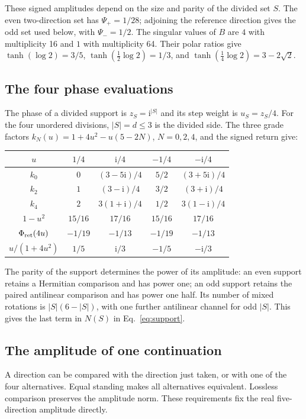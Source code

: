 \documentclass[aps,prx,onecolumn,10pt,notitlepage,nofootinbib,longbibliography]{revtex4-2}
\numberwithin{equation}{section}
\numberwithin{table}{section}
\newcommand{\ii}{\mathrm i}
\newcommand{\Phis}{\Phi_{\rm ret}}
\begin{document}
These signed amplitudes depend on the size and parity of the divided set $S$. The even two-direction set has $\Psi_+=1/28$; adjoining the reference direction gives the odd set used below, with $\Psi_-=1/2$. The singular values of $B$ are $4$ with multiplicity 16 and $1$ with multiplicity 64. Their polar ratios give $\tanh(\log2)=3/5$, $\tanh(\tfrac12\log2)=1/3$, and $\tanh(\tfrac14\log2)=3-2\sqrt2$.

\subsection{The four phase evaluations}
The phase of a divided support is $z_S=\ii^{|S|}$ and its step weight is $u_S=z_S/4$. For the four unordered divisions, $|S|=d\leq3$ is the divided side. The three grade factors $k_N(u)=1+4u^2-u(5-2N)$, $N=0,2,4$, and the signed return give:
\begin{center}\small
\setlength{\tabcolsep}{5pt}
\begin{tabular}{c|cccc}
\toprule
$u$&$1/4$&$\ii/4$&$-1/4$&$-\ii/4$\\\midrule
$k_0$&$0$&$(3-5\ii)/4$&$5/2$&$(3+5\ii)/4$\\
$k_2$&$1$&$(3-\ii)/4$&$3/2$&$(3+\ii)/4$\\
$k_4$&$2$&$3(1+\ii)/4$&$1/2$&$3(1-\ii)/4$\\
$1-u^2$&$15/16$&$17/16$&$15/16$&$17/16$\\
$\Phis(4u)$&$-1/19$&$-1/13$&$-1/19$&$-1/13$\\
$u/(1+4u^2)$&$1/5$&$\ii/3$&$-1/5$&$-\ii/3$\\\bottomrule
\end{tabular}
\end{center}
The parity of the support determines the power of its amplitude: an even
support retains a Hermitian comparison and has power one; an odd support
retains the paired antilinear comparison and has power one half. Its number
of mixed rotations is $|S|(6-|S|)$, with one further antilinear channel for
odd $|S|$. This gives the last term in $N(S)$ in Eq.~\eqref{eq:support}.

\subsection{The amplitude of one continuation}
\label{sec:stepamplitude}

A direction can be compared with the direction just taken, or with one of the four alternatives. Equal standing makes all alternatives equivalent. Lossless comparison preserves the amplitude norm. These requirements fix the real five-direction amplitude directly.
\end{document}
